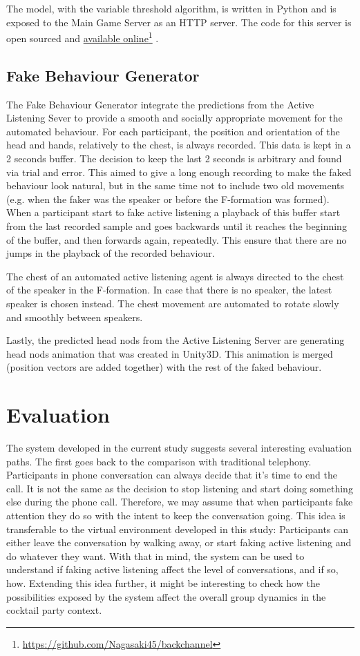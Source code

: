 \documentclass[]{simple-thesis}
\newcommand\fnurl[2]{%
  \href{#2}{#1}\footnote{\url{#2}}%
}
\begin{document}
The model, with the variable threshold algorithm, is written in Python and is exposed to the Main Game Server as an HTTP server.
The code for this server is open sourced and \fnurl{available online}{https://github.com/Nagasaki45/backchannel}.

\section{Fake Behaviour Generator}\label{system:fake_behaviour_generator}

The Fake Behaviour Generator integrate the predictions from the Active Listening Sever to provide a smooth and socially appropriate movement for the automated behaviour.
For each participant, the position and orientation of the head and hands, relatively to the chest, is always recorded.
This data is kept in a 2 seconds buffer.
The decision to keep the last 2 seconds is arbitrary and found via trial and error.
This aimed to give a long enough recording to make the faked behaviour look natural, but in the same time not to include two old movements (e.g. when the faker was the speaker or before the F-formation was formed).
When a participant start to fake active listening a playback of this buffer start from the last recorded sample and goes backwards until it reaches the beginning of the buffer, and then forwards again, repeatedly.
This ensure that there are no jumps in the playback of the recorded behaviour.

The chest of an automated active listening agent is always directed to the chest of the speaker in the F-formation.
In case that there is no speaker, the latest speaker is chosen instead.
The chest movement are automated to rotate slowly and smoothly between speakers.

Lastly, the predicted head nods from the Active Listening Server are generating head nods animation that was created in Unity3D.
This animation is merged (position vectors are added together) with the rest of the faked behaviour.


\chapter{Evaluation}\label{evaluation}

The system developed in the current study suggests several interesting evaluation paths.
The first goes back to the comparison with traditional telephony.
Participants in phone conversation can always decide that it's time to end the call.
It is not the same as the decision to stop listening and start doing something else during the phone call.
Therefore, we may assume that when participants fake attention they do so with the intent to keep the conversation going.
This idea is transferable to the virtual environment developed in this study:
Participants can either leave the conversation by walking away, or start faking active listening and do whatever they want.
With that in mind, the system can be used to understand if faking active listening affect the level of conversations, and if so, how.
Extending this idea further, it might be interesting to check how the possibilities exposed by the system affect the overall group dynamics in the cocktail party context.
\end{document}
